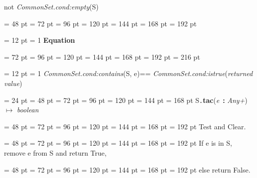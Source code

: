 {{{{{{{{not  {\em CommonSet.cond:empty\/}(S)\par}
\par}
\par}
\par}
\par}
{\par \noindent  \leftskip = 48 pt  \leftmargini = 72 pt  \leftmarginii = 96 pt  \leftmarginiii = 120 pt  \leftmarginiv = 144 pt  \leftmarginv = 168 pt  \leftmarginvi = 192 pt {\par \noindent
{\par \pagebreak[3.100000] \noindent \hangindent = 12 pt \hangafter = 1 
{\bf Equation\/}\par}
{\par \noindent  \leftskip = 72 pt  \leftmargini = 96 pt  \leftmarginii = 120 pt  \leftmarginiii = 144 pt  \leftmarginiv = 168 pt  \leftmarginv = 192 pt  \leftmarginvi = 216 pt {\par \noindent
{\par \pagebreak[3.000000] \noindent \hangindent = 12 pt \hangafter = 1 
{\bf {}\/} {\em CommonSet.cond:contains\/}(S, e){\large  == }{\bf {}\/} {\em CommonSet.cond:istrue\/}({\em returned value\/})\par}
\par}
\par}
\par}
\par}
\par}
\par}
{\par \noindent  \leftskip = 24 pt  \leftmargini = 48 pt  \leftmarginii = 72 pt  \leftmarginiii = 96 pt  \leftmarginiv = 120 pt  \leftmarginv = 144 pt  \leftmarginvi = 168 pt S{\tt .\/}{\bf {\large {\bf tac\/}}\/}({\em e\/}~{\bf :}  {\em Any+\/}) \(\mapsto \)  {\em boolean\/}{\par \noindent
{\par \noindent  \leftskip = 48 pt  \leftmargini = 72 pt  \leftmarginii = 96 pt  \leftmarginiii = 120 pt  \leftmarginiv = 144 pt  \leftmarginv = 168 pt  \leftmarginvi = 192 pt  Test and Clear.\par}
{\par \noindent  \leftskip = 48 pt  \leftmargini = 72 pt  \leftmarginii = 96 pt  \leftmarginiii = 120 pt  \leftmarginiv = 144 pt  \leftmarginv = 168 pt  \leftmarginvi = 192 pt  If e is in S, remove e from S and return True,\par}
{\par \noindent  \leftskip = 48 pt  \leftmargini = 72 pt  \leftmarginii = 96 pt  \leftmarginiii = 120 pt  \leftmarginiv = 144 pt  \leftmarginv = 168 pt  \leftmarginvi = 192 pt  else return False.\par}
}}}
